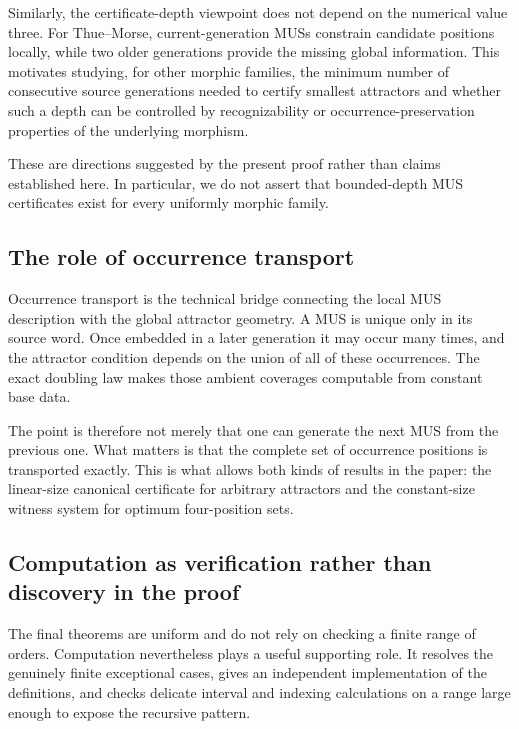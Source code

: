\documentclass[11pt,a4paper]{article}
\theoremstyle{definition}\newtheorem{definition}[theorem]{Definition}
\theoremstyle{remark}\newtheorem{remark}[theorem]{Remark}
\begin{document}
Similarly, the certificate-depth viewpoint does not depend on the numerical value three.  For Thue--Morse, current-generation MUSs constrain candidate positions locally, while two older generations provide the missing global information.  This motivates studying, for other morphic families, the minimum number of consecutive source generations needed to certify smallest attractors and whether such a depth can be controlled by recognizability or occurrence-preservation properties of the underlying morphism.

These are directions suggested by the present proof rather than claims established here.  In particular, we do not assert that bounded-depth MUS certificates exist for every uniformly morphic family.

\subsection{The role of occurrence transport}
\label{subsec:role-occurrence-transport}

Occurrence transport is the technical bridge connecting the local MUS description with the global attractor geometry.  A MUS is unique only in its source word.  Once embedded in a later generation it may occur many times, and the attractor condition depends on the union of all of these occurrences.  The exact doubling law makes those ambient coverages computable from constant base data.

The point is therefore not merely that one can generate the next MUS from the previous one.  What matters is that the complete set of occurrence positions is transported exactly.  This is what allows both kinds of results in the paper: the linear-size canonical certificate for arbitrary attractors and the constant-size witness system for optimum four-position sets.

\subsection{Computation as verification rather than discovery in the proof}
\label{subsec:role-computation}

The final theorems are uniform and do not rely on checking a finite range of orders.  Computation nevertheless plays a useful supporting role.  It resolves the genuinely finite exceptional cases, gives an independent implementation of the definitions, and checks delicate interval and indexing calculations on a range large enough to expose the recursive pattern.
\end{document}
